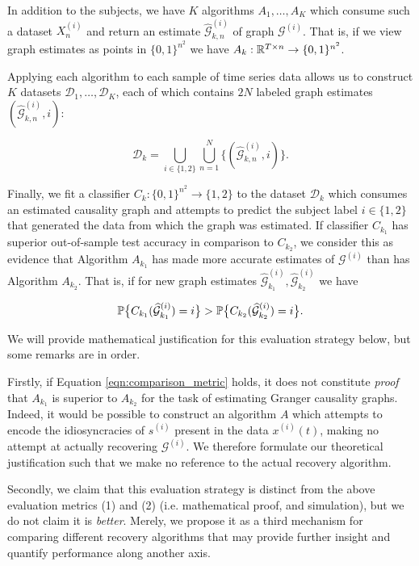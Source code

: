 \documentclass[12pt]{article}
\def\gcg{\mathcal{G}}  %
\begin{document}
In addition to the subjects, we have $K$ algorithms $A_1, \ldots, A_K$
which consume such a dataset $X_n^{(i)}$ and return an estimate
$\widehat{\gcg}_{k,n}^{(i)}$ of graph $\gcg^{(i)}$.  That is, if we
view graph estimates as points in $\{0, 1\}^{n^2}$ we have
$A_k: \mathbb{R}^{T \times n} \rightarrow \{0, 1\}^{n^2}$.

Applying each algorithm to each sample of time series data allows us
to construct $K$ datasets $\mathcal{D}_1, \ldots, \mathcal{D}_K$, each
of which contains $2N$ labeled graph estimates
$(\widehat{\gcg}_{k, n}^{(i)}, i)$:

\[
  \mathcal{D}_k = \bigcup_{i \in \{1, 2\}} \bigcup_{n = 1}^N \{(\widehat{\gcg}_{k, n}^{(i)}, i)\}.
\]

Finally, we fit a classifier
$C_k: \{0, 1\}^{n^2} \rightarrow \{1, 2\}$ to the dataset
$\mathcal{D}_k$ which consumes an estimated causality graph and
attempts to predict the subject label $i \in \{1, 2\}$ that generated
the data from which the graph was estimated.  If classifier $C_{k_1}$
has superior out-of-sample test accuracy in comparison to $C_{k_2}$,
we consider this as evidence that Algorithm $A_{k_1}$ has made more
accurate estimates of $\gcg^{(i)}$ than has Algorithm $A_{k_2}$.  That
is, if for new graph estimates
$\widehat{\gcg}_{k_1}^{(i)}, \widehat{\gcg}_{k_2}^{(i)}$ we have

\begin{equation}
  \label{eqn:comparison_metric}
  \P\big\{C_{k_1}(\widehat{\gcg}_{k_1}^{(i)}) = i\big\} > \P\big\{C_{k_2}(\widehat{\gcg}_{k_2}^{(i)}) = i\big\}.
\end{equation}

\begin{remark}
We will provide mathematical justification for this evaluation
strategy below, but some remarks are in order.

Firstly, if Equation \ref{eqn:comparison_metric} holds, it does not
constitute \textit{proof} that $A_{k_1}$ is superior to $A_{k_2}$ for
the task of estimating Granger causality graphs.  Indeed, it would be
possible to construct an algorithm $A$ which attempts to encode the
idiosyncracies of $s^{(i)}$ present in the data $x^{(i)}(t)$, making
no attempt at actually recovering $\gcg^{(i)}$.  We therefore
formulate our theoretical justification such that we make no reference
to the actual recovery algorithm.

Secondly, we claim that this evaluation strategy is distinct from the
above evaluation metrics (1) and (2) (i.e. mathematical proof, and
simulation), but we do not claim it is \textit{better}.  Merely, we
propose it as a third mechanism for comparing different recovery
algorithms that may provide further insight and quantify performance
along another axis.
\end{remark}
\end{document}
